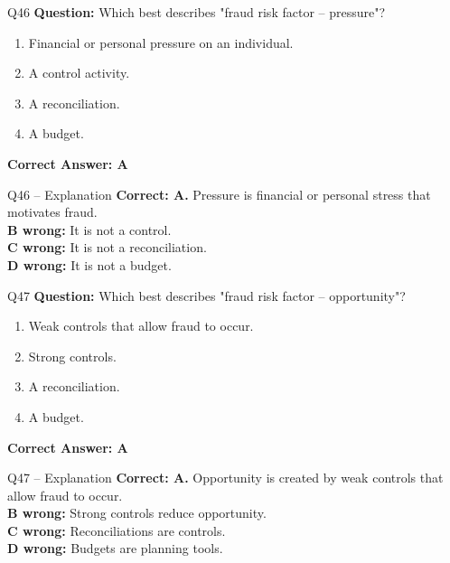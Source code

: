 \documentclass[aspectratio=169,10pt]{beamer}
\begin{document}
	\begin{frame}[t]{Q46}
		\small
		\textbf{Question:} Which best describes "fraud risk factor -- pressure"?
		\begin{enumerate}[label=\Alph*.,itemsep=1pt,topsep=2pt]
			\item Financial or personal pressure on an individual.
			\item A control activity.
			\item A reconciliation.
			\item A budget.
		\end{enumerate}
		\vspace{4pt}
		\textbf{Correct Answer: A}
	\end{frame}
	
	\begin{frame}[t]{Q46 -- Explanation}
		\small
		\textbf{Correct: A.} Pressure is financial or personal stress that motivates fraud. \\[4pt]
		\textbf{B wrong:} It is not a control. \\[2pt]
		\textbf{C wrong:} It is not a reconciliation. \\[2pt]
		\textbf{D wrong:} It is not a budget.
	\end{frame}
	
	\begin{frame}[t]{Q47}
		\small
		\textbf{Question:} Which best describes "fraud risk factor -- opportunity"?
		\begin{enumerate}[label=\Alph*.,itemsep=1pt,topsep=2pt]
			\item Weak controls that allow fraud to occur.
			\item Strong controls.
			\item A reconciliation.
			\item A budget.
		\end{enumerate}
		\vspace{4pt}
		\textbf{Correct Answer: A}
	\end{frame}
	
	\begin{frame}[t]{Q47 -- Explanation}
		\small
		\textbf{Correct: A.} Opportunity is created by weak controls that allow fraud to occur. \\[4pt]
		\textbf{B wrong:} Strong controls reduce opportunity. \\[2pt]
		\textbf{C wrong:} Reconciliations are controls. \\[2pt]
		\textbf{D wrong:} Budgets are planning tools.
	\end{frame}
	
\end{document}
